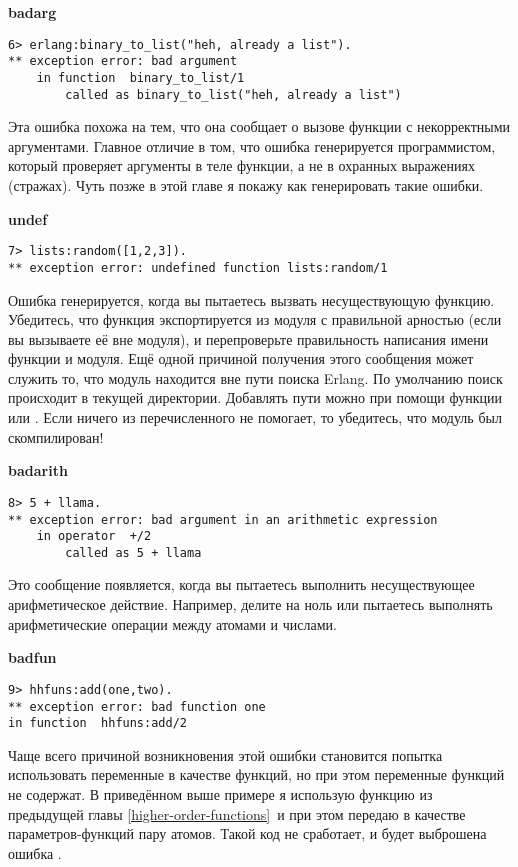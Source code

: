\textbf{badarg}
\begin{lstlisting}[style=erlang]
6> erlang:binary_to_list("heh, already a list").
** exception error: bad argument
    in function  binary_to_list/1
        called as binary_to_list("heh, already a list")
\end{lstlisting}

Эта ошибка похожа на  тем, что она сообщает о вызове функции с некорректными аргументами.
Главное отличие в том, что ошибка генерируется программистом, который проверяет аргументы в теле функции, а не в охранных выражениях (стражах).
Чуть позже в этой главе я покажу как генерировать такие ошибки.
\blankline

\textbf{undef}
\begin{lstlisting}[style=erlang]
7> lists:random([1,2,3]).
** exception error: undefined function lists:random/1
\end{lstlisting}

Ошибка генерируется, когда вы пытаетесь вызвать несуществующую функцию.
Убедитесь, что функция экспортируется из модуля с правильной арностью (если вы вызываете её вне модуля), и перепроверьте правильность написания имени функции и модуля.
Ещё одной причиной получения этого сообщения может служить то, что модуль находится вне пути поиска Erlang.
По умолчанию поиск происходит в текущей директории. Добавлять пути можно при помощи функции  или .
Если ничего из перечисленного не помогает, то убедитесь, что модуль был скомпилирован!
\blankline

\textbf{badarith}
\begin{lstlisting}[style=erlang]
8> 5 + llama.
** exception error: bad argument in an arithmetic expression
    in operator  +/2
        called as 5 + llama
\end{lstlisting}

Это сообщение появляется, когда вы пытаетесь выполнить несуществующее арифметическое действие.
Например, делите на ноль или пытаетесь выполнять арифметические операции между атомами и числами.
\blankline

\textbf{badfun}
\begin{lstlisting}[style=erlang]
9> hhfuns:add(one,two).
** exception error: bad function one
in function  hhfuns:add/2
\end{lstlisting}

Чаще всего причиной возникновения этой ошибки становится попытка использовать переменные в качестве функций, но при этом переменные функций не содержат.
В приведённом выше примере я использую функцию  из предыдущей главы \ref{higher-order-functions}~и при этом передаю в качестве параметров\--функций пару атомов.
Такой код не сработает, и будет выброшена ошибка .
\blankline

